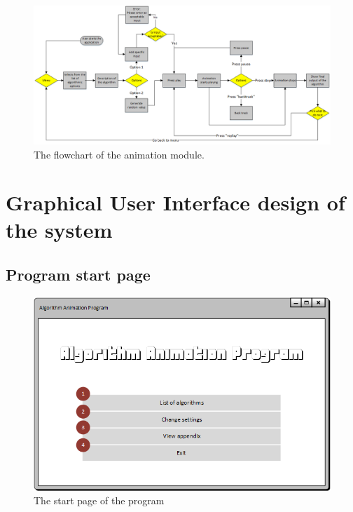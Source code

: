 \begin{landscape}
\begin{figure}[H]
\centering
\hspace*{-2cm}
\includegraphics[scale=0.9]{images/report_images/flowchartAnimation.png}
\caption{The flowchart of the animation module.}
\label{flowchartAnimation}
\end{figure}
\end{landscape}

\newpage

\newpage
\section{Graphical User Interface design of the system} \label{uiDesign}
\subsection{Program start page}

\begin{figure}[H]
\centering
\includegraphics[scale=1]{images/report_images/uiStartWindow.png}
\caption{The start page of the program}
\label{uiStartWindow}
\end{figure}

